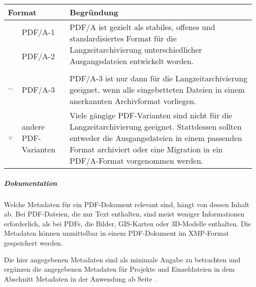 \begin{center}
	\begin{tabular}{l p{} p{}}
		\toprule
		\multicolumn{2}{l}{Format} & Begründung \\ \midrule
		\multirow{3}{*}{\color{ForestGreen} \LARGE \checkmark} & PDF/A-1 & \multirow{2}{*}{\parbox{0.6\textwidth}{PDF/A ist gezielt als stabiles, offenes und standardisiertes Format für die Langzeitarchivierung unterschiedlicher Ausgangsdateien entwickelt worden.}}\\
		& PDF/A-2 & \\
		& &\\
		\cmidrule(r){1-3}
		\multirow{1}{*}{$\color{BurntOrange} \thicksim$} & PDF/A-3 & PDF/A-3 ist nur dann für die Langzeitarchivierung geeignet, wenn alle eingebetteten Dateien in einem anerkannten Archivformat vorliegen.\\
		\cmidrule(r){1-3}
		\multirow{1}{*}{\LARGE \boldmath$\color{BrickRed} \times$}& andere PDF-Varianten & Viele gängige PDF-Varianten sind nicht für die Langzeitarchivierung geeignet. Stattdessen sollten entweder die Ausgangsdateien in einem passenden Format archiviert oder eine Migration in ein PDF/A-Format vorgenommen werden.\\
		\bottomrule
		\bottomrule
	\end{tabular}
\end{center}

\newpage
\subparagraph{Dokumentation}
Welche Metadaten für ein PDF-Dokument relevant sind, hängt von dessen Inhalt ab. Bei PDF-Dateien, die nur Text enthalten, sind meist weniger Informationen erforderlich, als bei PDFs, die Bilder, GIS-Karten oder 3D-Modelle enthalten. Die Metadaten können unmittelbar in einem PDF-Dokument im XMP-Format gespeichert werden.

Die hier angegebenen Metadaten sind als minimale Angabe zu betrachten und ergänzen die angegebenen Metadaten für Projekte und Einzeldateien in dem Abschnitt Metadaten in der Anwendung ab Seite \pageref{Metadaten-anwendung}.

